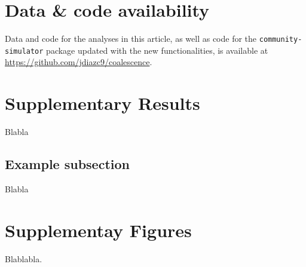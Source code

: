 \documentclass[a4paper,10pt]{article}
\begin{document}
\clearpage

\section{Data \& code availability}
\label{supp-datacode}

Data and code for the analyses in this article, as well as code for the
\texttt{community-simulator} package updated with the new functionalities,
is available at \url{https://github.com/jdiazc9/coalescence}.

\clearpage

\section{Supplementary Results}\label{supp-results}

Blabla

\subsection{Example subsection}
\label{supp-results:example}

Blabla

\clearpage

\section{Supplementay Figures}\label{supp-figs}

Blablabla.

\clearpage

%  
% 
%
\end{document}
